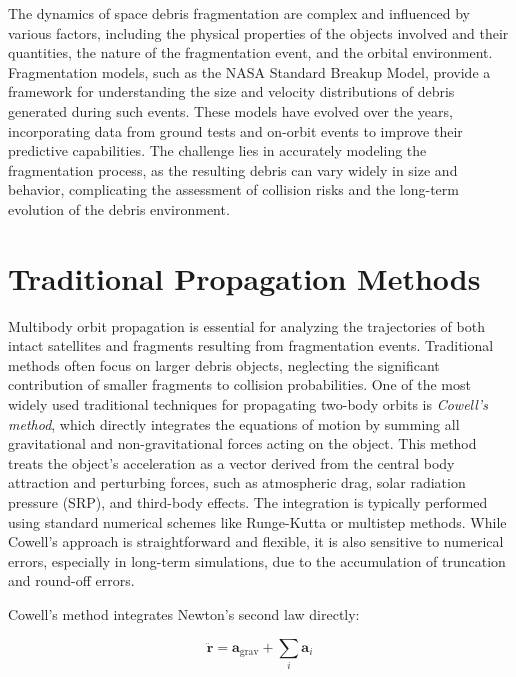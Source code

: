 \documentclass[letterpaper, preprint, paper,11pt]{AAS}	%
\begin{document}
The dynamics of space debris fragmentation are complex and influenced by various factors, including the physical properties of the objects involved and their quantities, the nature of the fragmentation event, and the orbital environment. Fragmentation models, such as the NASA Standard Breakup Model\cite{johnson_nasas_2001}, provide a framework for understanding the size and velocity distributions of debris generated during such events. These models have evolved over the years, incorporating data from ground tests and on-orbit events to improve their predictive capabilities. The challenge lies in accurately modeling the fragmentation process, as the resulting debris can vary widely in size and behavior, complicating the assessment of collision risks and the long-term evolution of the debris environment.


\section{Traditional Propagation Methods}
Multibody orbit propagation is essential for analyzing the trajectories of both intact satellites and fragments resulting from fragmentation events. Traditional methods often focus on larger debris objects, neglecting the significant contribution of smaller fragments to collision probabilities. One of the most widely used traditional techniques for propagating two-body orbits is \textit{Cowell’s method}, which directly integrates the equations of motion by summing all gravitational and non-gravitational forces acting on the object. This method treats the object’s acceleration as a vector derived from the central body attraction and perturbing forces, such as atmospheric drag, solar radiation pressure (SRP), and third-body effects. The integration is typically performed using standard numerical schemes like Runge-Kutta or multistep methods. While Cowell’s approach is straightforward and flexible, it is also sensitive to numerical errors, especially in long-term simulations, due to the accumulation of truncation and round-off errors.

Cowell’s method integrates Newton’s second law directly:

\begin{equation}
\ddot{\mathbf{r}} = \mathbf{a}_{\text{grav}} + \sum_{i} \mathbf{a}_{i}
\end{equation}
\end{document}
